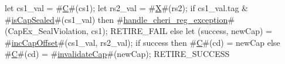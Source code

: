 let cs1_val = #\hyperref[sailRISCVzC]{C}#(cs1);
let rs2_val = #\hyperref[sailRISCVzX]{X}#(rs2);
if cs1_val.tag & #\hyperref[sailRISCVzisCapSealed]{isCapSealed}#(cs1_val) then {
  #\hyperref[sailRISCVzhandlezycherizyregzyexception]{handle\_cheri\_reg\_exception}#(CapEx_SealViolation, cs1);
  RETIRE_FAIL
} else {
  let (success, newCap) = #\hyperref[sailRISCVzincCapOffset]{incCapOffset}#(cs1_val, rs2_val);
  if success then
    #\hyperref[sailRISCVzC]{C}#(cd) = newCap
  else
    #\hyperref[sailRISCVzC]{C}#(cd) = #\hyperref[sailRISCVzinvalidateCap]{invalidateCap}#(newCap);
  RETIRE_SUCCESS
}
